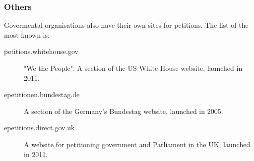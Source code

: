 \subsubsection*{Others}
Govermental organisations also have their own sites for petitions. The list of the most known is:
\begin{description}
\item[petitions.whitehouse.gov] "We the People". A section of the US White House website, launched in 2011.
\item[epetitionen.bundestag.de] A section of the Germany's Bundestag website, launched in 2005.
\item[epetitions.direct.gov.uk] A website for petitioning government and Parliament in the UK, launched in 2011.
\end{description}